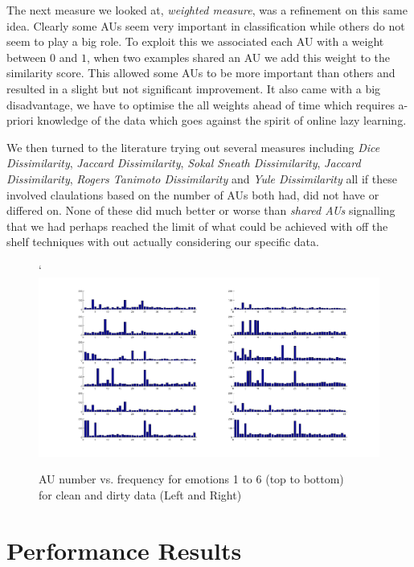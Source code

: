\documentclass[10pt,a4paper]{article}
\begin{document}
The next measure we looked at, \emph{weighted measure}, was a refinement on this same idea.
Clearly some AUs seem very important in classification while others do not seem to play a big role.
To exploit this we associated each AU with a weight between $0$ and $1$, when two examples shared an AU we add this weight to the similarity score. 
This allowed some AUs to be more important than others and resulted in a slight but not significant improvement. 
It also came with a big disadvantage, we have to optimise the all weights ahead of time which requires a-priori knowledge of the data which goes against the spirit of online lazy learning.

We then turned to the literature trying out several measures including \emph{Dice Dissimilarity}, \emph{Jaccard Dissimilarity}, \emph{Sokal Sneath Dissimilarity}, \emph{Jaccard Dissimilarity}, \emph{Rogers Tanimoto Dissimilarity} and \emph{Yule Dissimilarity} all if these involved claulations based on the number of AUs both had, did not have or differed on. 
None of these did much better or worse than \emph{shared AUs} signalling that we had perhaps reached the limit of what could be achieved with off the shelf techniques with out actually considering our specific data.
\begin{figure}[!t]
	\centering
`	\includegraphics[scale=0.5, angle=90]{images/au_count.png}
	\caption{AU number vs. frequency for emotions 1 to 6 (top to bottom) \\for clean and dirty data (Left and Right)}
	\label{fig:au_counts}
\end{figure}

\section{Performance Results}
\end{document}
